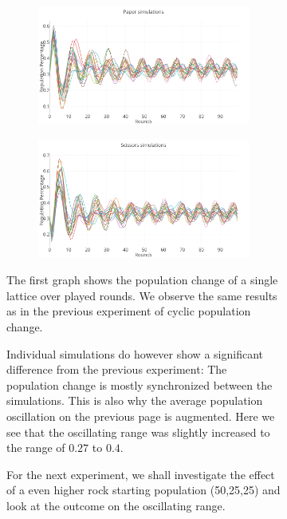 \documentclass[a4paper, 11pt]{article}
\begin{document}
\begin{figure}[H]
\begin{subfigure}{.65\textwidth}
	\begin{subfigure}{1\textwidth}
		\includegraphics[width=1\linewidth]{50x50_40RockDist_PaperGames}
	\end{subfigure}	
	
	\begin{subfigure}{1\textwidth}
		\includegraphics[width=1\linewidth]{50x50_40RockDist_ScissorsGames}
	\end{subfigure}		
	
\end{subfigure}%
\begin{subfigure}{.35\textwidth}

	The first graph shows the population change of a single lattice over played rounds. We observe the same results as in the previous experiment of cyclic population change.
	
	Individual simulations do however show a significant difference from the previous experiment: The population change is mostly synchronized between the simulations. This is also why the average population oscillation on the previous page is augmented. Here we see that the oscillating range was slightly increased to the range of $0.27$ to $0.4$.
	
	
	For the next experiment, we shall investigate the effect of a even higher rock starting population (50,25,25) and look at the outcome on the oscillating range.
\end{subfigure}

\end{figure}
\end{document}
